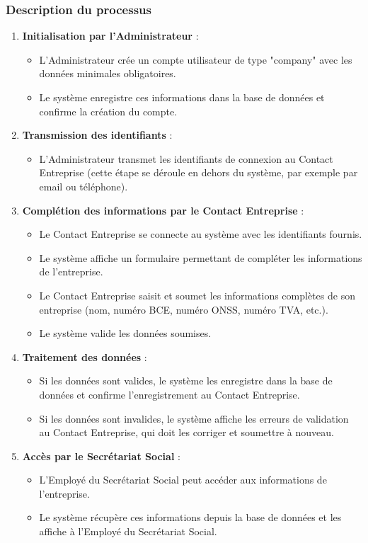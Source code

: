 \subsubsection{Description du processus}

\begin{enumerate}
  \item \textbf{Initialisation par l'Administrateur} :
    \begin{itemize}
      \item L'Administrateur crée un compte utilisateur de type "company" avec les données minimales obligatoires.
      \item Le système enregistre ces informations dans la base de données et confirme la création du compte.
    \end{itemize}

  \item \textbf{Transmission des identifiants} :
    \begin{itemize}
      \item L'Administrateur transmet les identifiants de connexion au Contact Entreprise (cette étape se déroule en dehors du système, par exemple par email ou téléphone).
    \end{itemize}

  \item \textbf{Complétion des informations par le Contact Entreprise} :
    \begin{itemize}
      \item Le Contact Entreprise se connecte au système avec les identifiants fournis.
      \item Le système affiche un formulaire permettant de compléter les informations de l'entreprise.
      \item Le Contact Entreprise saisit et soumet les informations complètes de son entreprise (nom, numéro BCE, numéro ONSS, numéro TVA, etc.).
      \item Le système valide les données soumises.
    \end{itemize}

  \item \textbf{Traitement des données} :
    \begin{itemize}
      \item Si les données sont valides, le système les enregistre dans la base de données et confirme l'enregistrement au Contact Entreprise.
      \item Si les données sont invalides, le système affiche les erreurs de validation au Contact Entreprise, qui doit les corriger et soumettre à nouveau.
    \end{itemize}

  \item \textbf{Accès par le Secrétariat Social} :
    \begin{itemize}
      \item L'Employé du Secrétariat Social peut accéder aux informations de l'entreprise.
      \item Le système récupère ces informations depuis la base de données et les affiche à l'Employé du Secrétariat Social.
    \end{itemize}
\end{enumerate}


